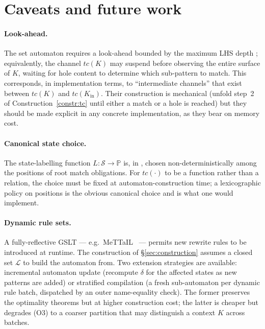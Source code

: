 \documentclass[11pt]{article}
\theoremstyle{plain}
\theoremstyle{definition}
\theoremstyle{remark}
\newcommand{\Pos}{\mathbb{P}}
\newcommand{\States}{\mathcal{S}}
\newcommand{\Lhs}{\mathcal{L}}
\begin{document}
\section{Caveats and future work}\label{sec:caveats}

\paragraph{Look-ahead.}
The set automaton requires a look-ahead bounded by the maximum LHS depth
\cite[\S 1.1]{BouwmanErkens2022}; equivalently, the channel $tc(K)$ may
suspend before observing the entire surface of $K$, waiting for hole
content to determine which sub-pattern to match. This corresponds, in
implementation terms, to ``intermediate channels'' that exist between
$tc(K)$ and $tc(K_{\mathrm{in}})$. Their construction is mechanical
(unfold step~2 of Construction~\ref{constr:tc} until either a match or a
hole is reached) but they should be made explicit in any concrete
implementation, as they bear on memory cost.

\paragraph{Canonical state choice.}
The state-labelling function $L : \States \to \Pos$ is, in
\cite{BouwmanErkens2022}, chosen non-deterministically among the
positions of root match obligations. For $tc(\cdot)$ to be a function
rather than a relation, the choice must be fixed at automaton-construction
time; a lexicographic policy on positions is the obvious canonical
choice and is what one would implement.

\paragraph{Dynamic rule sets.}
A fully-reflective GSLT --- e.g.\ MeTTaIL~\cite{F1R3FLY-mettail} ---
permits new rewrite rules to be introduced at runtime. The
construction of \S\ref{sec:construction} assumes a closed set $\Lhs$ to
build the automaton from. Two extension strategies are available:
incremental automaton update (recompute $\delta$ for the affected states
as new patterns are added) or stratified compilation (a fresh
sub-automaton per dynamic rule batch, dispatched by an outer name-equality
check). The former preserves the optimality theorems but at higher
construction cost; the latter is cheaper but degrades (O3) to a coarser
partition that may distinguish a context $K$ across batches.
\end{document}
